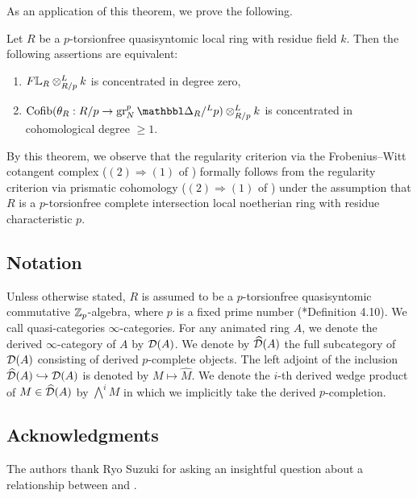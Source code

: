 \documentclass[11pt,a4paper]{amsart}
\begin{document}
As an application of this theorem, we prove the following.
\begin{maintheorem}\label{theorem1.6}
    Let $R$ be a $p$-torsionfree quasisyntomic local ring with residue field $k$. Then the following assertions are equivalent:
    \begin{enumerate}
        \item $F\mathbb{L}_R\otimes^L_{R/p}k$ is concentrated in degree zero,
        \item $\Cofib(\theta_R:R/p\to \gr^p_N\prism_R/^Lp)\otimes_{R/p}^Lk$ is concentrated in cohomological degree $\ge 1$.
    \end{enumerate}
\end{maintheorem}
By this theorem, we observe that the regularity criterion via the Frobenius--Witt cotangent complex ($(2)\Rightarrow (1)$ of ) formally follows from the regularity criterion via prismatic cohomology ($(2)\Rightarrow (1)$ of ) under the assumption that $R$ is a \(p\)-torsionfree complete intersection local noetherian ring with residue characteristic $p$. 

\subsection*{Notation}\label{notation}
Unless otherwise stated, $R$ is assumed to be a $p$-torsionfree quasisyntomic commutative $\mathbb{Z}_p$-algebra, where $p$ is a fixed prime number (\cite{bhatt2019Topological}*{Definition 4.10}).
We call quasi-categories $\infty$-categories. For any animated ring $A$, we denote the derived $\infty$-category of $A$ by $\mathcal{D}(A)$. We denote by $\widehat{\mathcal{D}}(A)$ the full subcategory of $\mathcal{D}(A)$ consisting of derived $p$-complete objects. The left adjoint of the inclusion $\widehat{\mathcal{D}}(A)\hookrightarrow \mathcal{D}(A)$ is denoted by $M\mapsto \widehat{M}$. We denote the $i$-th derived wedge product of $M\in \widehat{\mathcal{D}}(A)$ by $\bigwedge^iM$ in which we implicitly take the derived $p$-completion.

\subsection*{Acknowledgments}
The authors thank Ryo Suzuki for asking an insightful question about a relationship between \cite{shimada2026Arithmetic}
and \cite{petrov2025Nondecomposability}.
\end{document}
